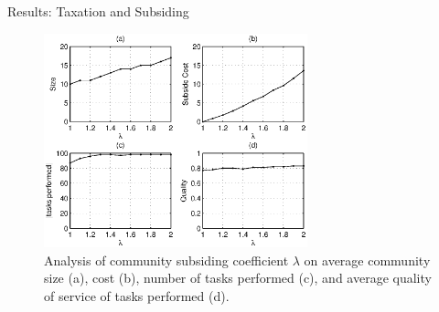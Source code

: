 \documentclass{beamer}
\begin{document}
\begin{frame}{Results: Taxation and Subsiding}
    \begin{figure}[!t]
        \centering
        \includegraphics[width=3in]{figures/taxtation.eps}
        \caption{Analysis of community subsiding coefficient $\lambda$ on
        average community size (a), cost (b), number of tasks performed
        (c), and average quality of service of tasks performed (d).}
        \label{f_taxtation}
    \end{figure}
\end{frame}
\end{document}
